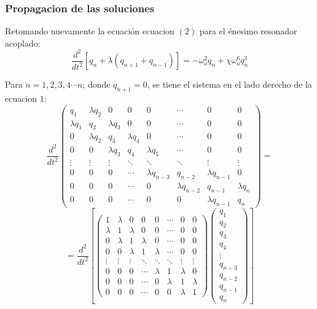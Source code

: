 \documentclass[11pt,letterpaper,twocolumn]{article}
\begin{document}
\subsubsection*{Propagacion de las soluciones}
Retomando nuevamente la ecuación ecuacion $(2)$ para el énesimo resonador acoplado: 
$$\dfrac{d^{2}}{dt^{2}} \left[ q_{n} + \lambda \left( q_{n+1} + q_{n-1}\right) \right] = - \omega_{o}^{2} q_{n} + \chi \omega_{o}^{6} q_{n}^{3} $$
\par 
Para $n=1,2,3,4 \cdots n$; donde $q_{n+1}=0$, se tiene el sistema en el lado derecho de la ecuacion $1$:
{\fontsize{9}{15}\selectfont
$$\dfrac{d^{2}}{dt^{2}} \left(
\begin{matrix}
q_{1} & \lambda q_{2} & 0 & 0 & 0 & \cdots & 0 & 0 \\
\lambda q_{1} & q_{2} & \lambda q_{3} & 0 & 0 & \cdots & 0 & 0\\
0 & \lambda q_{2} & q_{3} & \lambda q_{4}  & 0 & \cdots & 0& 0 \\
0 & 0 & \lambda q_{3} & q_{4} & \lambda q_{5}  & \cdots & 0 & 0 \\
\vdots & \vdots & \vdots & \ddots & \ddots & \ddots & \vdots & \vdots \\
0 & 0 & 0 & \cdots & \lambda q_{n-3} &  q_{n-2} & \lambda q_{n-1} &0\\    
0 & 0 & 0 & \cdots & 0 & \lambda q_{n-2} & q_{n-1} & \lambda q_{n}\\    
0 & 0 & 0 & \cdots & 0 & 0 & \lambda q_{n-1} & q_{n}     
\end{matrix} \right) = $$
$$=  \dfrac{d^{2}}{dt^{2}} \left[ 
\left(
\begin{matrix}
1 & \lambda  & 0 & 0 & 0 & \cdots & 0 & 0 \\
\lambda & 1 & \lambda  & 0 & 0 & \cdots & 0 & 0\\
0 & \lambda  & 1 & \lambda   & 0 & \cdots & 0& 0 \\
0 & 0 & \lambda  & 1 & \lambda   & \cdots & 0 & 0 \\
\vdots & \vdots & \vdots & \ddots & \ddots & \ddots & \vdots & \vdots \\
0 & 0 & 0 & \cdots & \lambda  &  1 & \lambda &0\\    
0 & 0 & 0 & \cdots & 0 & \lambda  & 1 & \lambda\\    
0 & 0 & 0 & \cdots & 0 & 0 & \lambda  & 1    
\end{matrix} \right) \left(
\begin{matrix}
q_{1}\\
q_{2}\\
q_{3}\\
q_{4}\\
\vdots\\
q_{n-3}\\
q_{n-2}\\
q_{n-1}\\
q_{n}
\end{matrix} \right) \right]$$
}
\end{document}
